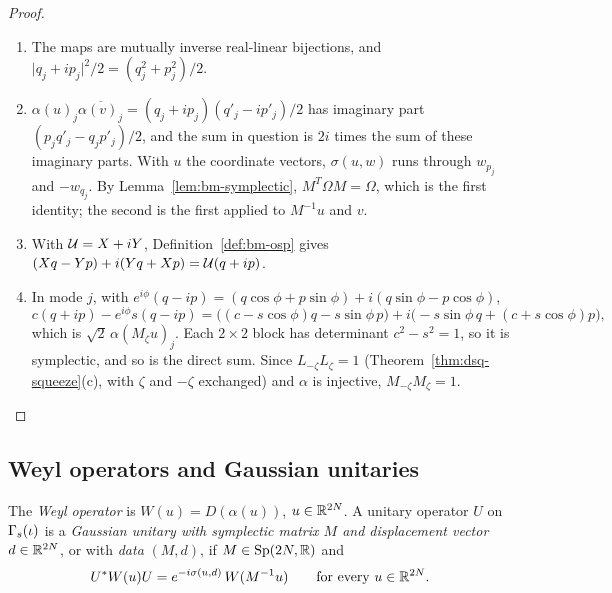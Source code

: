 \begin{veteenv}
\begin{proof}
\begin{enumerate}
\item[(a)] The maps are mutually inverse real-linear bijections, and $\lvert q_j+ip_j\rvert^2/2=(q_j^2+p_j^2)/2$.
\item[(b)] $\alpha(u)_j\overline{\alpha(v)_j}=(q_j+ip_j)(q'_j-ip'_j)/2$ has imaginary part $(p_jq'_j-q_jp'_j)/2$, and the sum in question
is $2i$ times the sum of these imaginary parts. With $u$ the coordinate vectors, $\sigma(u,w)$ runs through $w_{p_j}$ and $-w_{q_j}$.
By Lemma~\ref{lem:bm-symplectic}, $M^T\Omega M=\Omega$, which is the first identity; the second is the first applied to $M^{-1}u$
and $v$.
\item[(c)] With $\mathcal U=X+iY$, Definition~\ref{def:bm-osp} gives $(Xq-Yp)+i(Yq+Xp)=\mathcal U(q+ip)$.
\item[(d)] In mode $j$, with $e^{i\phi}(q-ip)=(q\cos\phi+p\sin\phi)+i(q\sin\phi-p\cos\phi)$,
\[
 c(q+ip)-e^{i\phi}s(q-ip)=\bigl((c-s\cos\phi)q-s\sin\phi\,p\bigr)+i\bigl(-s\sin\phi\,q+(c+s\cos\phi)p\bigr),
\]
which is $\sqrt2\,\alpha(M_\zeta u)_j$. Each $2\times2$ block has determinant $c^2-s^2=1$, so it is symplectic, and so is the direct
sum. Since $L_{-\zeta}L_\zeta=1$ (Theorem~\ref{thm:dsq-squeeze}(c), with $\zeta$ and $-\zeta$ exchanged) and $\alpha$ is injective,
$M_{-\zeta}M_\zeta=1$.\qedhere
\end{enumerate}
\end{proof}

\subsection{Weyl operators and Gaussian unitaries}\label{sec:gu-weyl}

\begin{definition}\label{def:gu-weyl}
The \emph{Weyl operator} is $W(u)=D(\alpha(u))$, $u\in\mathbb R^{2N}$. A unitary operator $U$ on $\Gamma_s(\iota)$ is a \emph{Gaussian unitary with
symplectic matrix $M$ and displacement vector $d\in\mathbb R^{2N}$}, or with \emph{data} $(M,d)$, if $M\in\mathrm{Sp}(2N,\mathbb R)$ and
\[
 U^*W(u)U=e^{-i\sigma(u,d)}\,W(M^{-1}u)\qquad\text{for every }u\in\mathbb R^{2N}.
\]
\end{definition}


\end{veteenv}
